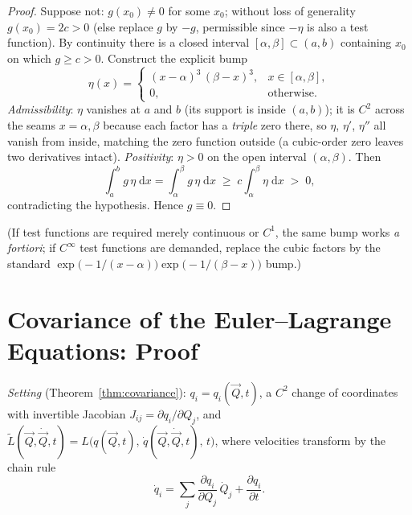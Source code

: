 \documentclass[11pt]{article}
\theoremstyle{plain}
\theoremstyle{definition}
\theoremstyle{remark}
\newcommand{\dd}{\mathrm{d}}
\newcommand{\pd}[2]{\frac{\partial #1}{\partial #2}}
\begin{document}
\begin{proof}
Suppose not: $g(x_0) \neq 0$ for some $x_0$; without loss of generality
$g(x_0) = 2c > 0$ (else replace $g$ by $-g$, permissible since $-\eta$ is
also a test function). By continuity there is a closed interval
$[\alpha,\beta] \subset (a,b)$ containing $x_0$ on which $g \ge c > 0$.
Construct the explicit bump
\begin{equation}
  \eta(x) =
  \begin{cases}
    (x - \alpha)^3\,(\beta - x)^3, & x \in [\alpha, \beta],\\[2pt]
    0, & \text{otherwise}.
  \end{cases}
\end{equation}
\emph{Admissibility}: $\eta$ vanishes at $a$ and $b$ (its support is
inside $(a,b)$); it is $C^2$ across the seams $x = \alpha, \beta$ because
each factor has a \emph{triple} zero there, so $\eta$, $\eta'$, $\eta''$
all vanish from inside, matching the zero function outside (a cubic-order
zero leaves two derivatives intact). \emph{Positivity}: $\eta > 0$ on the
open interval $(\alpha,\beta)$. Then
\begin{equation}
  \int_a^b g\,\eta\;\dd x
  = \int_\alpha^\beta g\,\eta\;\dd x
  \;\ge\; c\int_\alpha^\beta \eta\;\dd x \;>\; 0 ,
\end{equation}
contradicting the hypothesis. Hence $g \equiv 0$.
\end{proof}

(If test functions are required merely continuous or $C^1$, the same bump
works \emph{a fortiori}; if $C^\infty$ test functions are demanded,
replace the cubic factors by the standard
$\exp\bigl(-1/(x-\alpha)\bigr)\exp\bigl(-1/(\beta - x)\bigr)$ bump.)

\section{Covariance of the Euler--Lagrange Equations: Proof}
\label{app:covariance}

\emph{Setting} (Theorem~\ref{thm:covariance}): $q_i = q_i(\vec Q, t)$, a
$C^2$ change of coordinates with invertible Jacobian
$J_{ij} = \partial q_i/\partial Q_j$, and
$\widetilde L(\vec Q, \dot{\vec Q}, t)
= L\bigl(q(\vec Q,t),\, \dot q(\vec Q, \dot{\vec Q}, t),\, t\bigr)$, where
velocities transform by the chain rule
\begin{equation}
  \dot q_i = \sum_j \pd{q_i}{Q_j}\,\dot Q_j + \pd{q_i}{t} .
  \label{eq:velocity-transform}
\end{equation}
\end{document}
